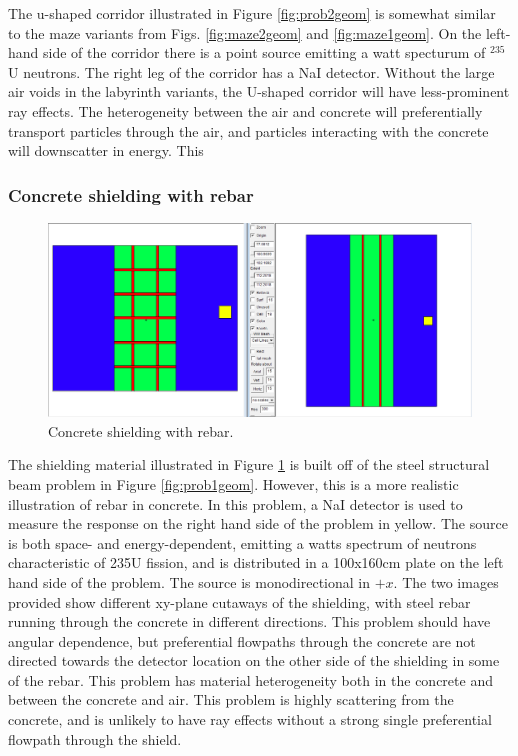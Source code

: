 The u-shaped corridor illustrated in Figure \ref{fig:prob2geom} is somewhat
similar to the maze variants from Figs. \ref{fig:maze2geom} and
\ref{fig:maze1geom}. On the left-hand side of the corridor there is a point source
emitting a watt specturum of $^{235}$U neutrons. The right leg of the corridor
has a NaI detector. Without the large air voids in the labyrinth variants, the
U-shaped corridor will have
less-prominent ray effects. The heterogeneity between
the air and concrete will preferentially transport particles through the air,
and particles interacting with the concrete will downscatter in energy. This

\subsubsection*{Concrete shielding with rebar}

\begin{figure}[h!]
  \centering
  \includegraphics[width=15cm]{./chapters/characterization_probs/figures/geometries/prob-4.png}
  \caption[Concrete shielding with rebar]{Concrete shielding with rebar.}
  \label{fig:prob4geom}
\end{figure}

The shielding material illustrated in Figure \ref{fig:prob4geom} is built off of
the steel structural beam problem in Figure \ref{fig:prob1geom}. However, this is a more
realistic illustration of rebar in concrete. In this problem, a NaI detector is
used to measure the response on the right hand side of the problem in yellow.
The source is both space- and energy-dependent, emitting a watts spectrum of
neutrons characteristic of 235U fission, and is distributed in a 100x160cm plate
on the left hand side of the problem. The source is monodirectional in $+x$.
The two images provided show
different xy-plane cutaways of the shielding, with steel rebar running through
the concrete in different directions. This problem should have angular
dependence, but preferential flowpaths through the concrete are not directed
towards the detector location on the other side of the shielding in some of the
rebar. This problem has material heterogeneity both in the concrete and between
the concrete and air. This problem is highly scattering from the concrete, and
is unlikely to have ray effects without a strong single preferential flowpath
through the shield.

